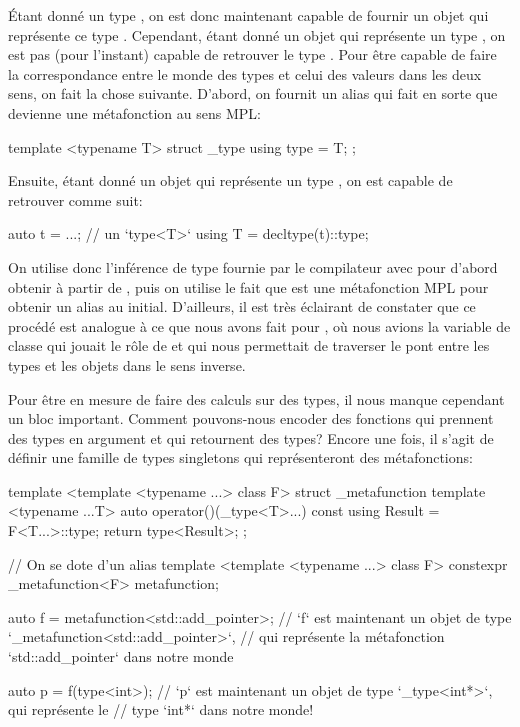 Étant donné un type , on est donc maintenant capable de fournir un
objet qui représente ce type . Cependant, étant donné un objet qui
représente un type , on est pas (pour l'instant) capable de retrouver
le type . Pour être capable de faire la correspondance entre le monde
des types et celui des valeurs dans les deux sens, on fait la chose suivante.
D'abord, on fournit un alias qui fait en sorte que  devienne
une métafonction au sens MPL:
\begin{cpp}
    template <typename T>
    struct _type {
        using type = T;
    };
\end{cpp}

Ensuite, étant donné un objet qui représente un type , on est capable
de retrouver  comme suit:
\begin{cpp}
    auto t = ...; // un `type<T>`
    using T = decltype(t)::type;
\end{cpp}

On utilise donc l'inférence de type fournie par le compilateur avec
 pour d'abord obtenir  à partir de ,
puis on utilise le fait que  est une métafonction MPL pour
obtenir un alias au  initial. D'ailleurs, il est très éclairant de
constater que ce procédé est analogue à ce que nous avons fait pour
, où nous avions la variable de classe 
qui jouait le rôle de  et qui nous permettait de traverser le pont
entre les types et les objets dans le sens inverse.

Pour être en mesure de faire des calculs sur des types, il nous manque
cependant un bloc important. Comment pouvons-nous encoder des fonctions
qui prennent des types en argument et qui retournent des types? Encore une
fois, il s'agit de définir une famille de types singletons qui représenteront
des métafonctions:
\begin{cpp}
    template <template <typename ...> class F>
    struct _metafunction {
        template <typename ...T>
        auto operator()(_type<T>...) const {
            using Result = F<T...>::type;
            return type<Result>;
        }
    };

    // On se dote d'un alias
    template <template <typename ...> class F>
    constexpr _metafunction<F> metafunction{};

    auto f = metafunction<std::add_pointer>;
    // `f` est maintenant un objet de type `_metafunction<std::add_pointer>`,
    // qui représente la métafonction `std::add_pointer` dans notre monde

    auto p = f(type<int>);
    // `p` est maintenant un objet de type `_type<int*>`, qui représente le
    // type `int*` dans notre monde!
\end{cpp}

